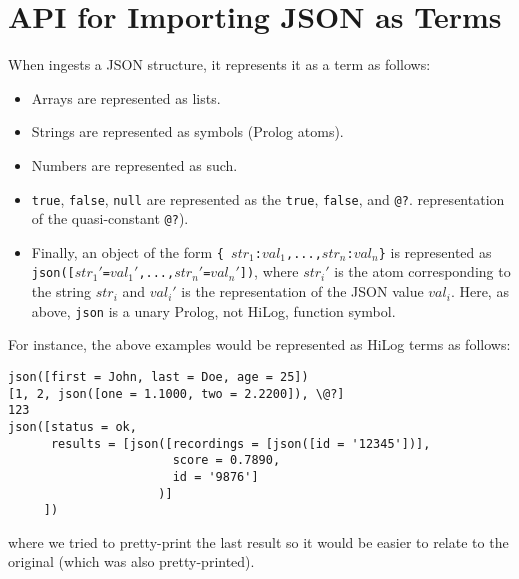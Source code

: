 \section{API for Importing JSON  as Terms}

When \ERGO ingests a JSON structure, it represents it as a term as follows:
\begin{itemize}
\item  Arrays are represented as lists.
\item  Strings are represented as \ERGO symbols (Prolog atoms).
\item  Numbers are represented as such.
\item  \texttt{true}, \texttt{false}, \texttt{null} are represented as the
  \texttt{\bs{}true},
  \texttt{\bs{}false}, and \texttt{\bs{}@?}.
  representation of the \FLSYSTEM quasi-constant \texttt{\bs{}@?}). 
\item Finally, an object of the form \texttt{\{
    $str_1$:$val_1$,...,$str_n$:$val_n$\}} is represented as
  \texttt{json([$str_1'$=$val_1'$,...,$str_n'$=$val_n'$])}, where
  $str_i'$ is the atom corresponding to the string $str_i$ and $val_i'$ is
  the \ERGO representation of the JSON value $val_i$.
  Here, as above, \texttt{json} is a unary Prolog, not HiLog, function
  symbol.
\end{itemize}
For instance, the above examples would be represented as HiLog 
\ERGO terms as follows:
\begin{verbatim}
json([first = John, last = Doe, age = 25])
[1, 2, json([one = 1.1000, two = 2.2200]), \@?]
123
json([status = ok,
      results = [json([recordings = [json([id = '12345'])],
                       score = 0.7890,
                       id = '9876']
                     )]
     ])
\end{verbatim}
where we tried to pretty-print the last result so it would be easier to
relate to the original (which was also pretty-printed).

